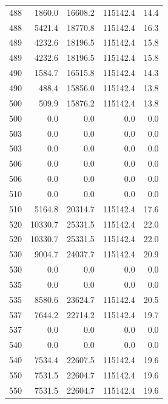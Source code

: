 \begin{longtable}{rrrrr}
    488 & \num{1860.0} & \num{16608.2} & \num{115142.4} & 14.4 \\
    488 & \num{5421.4} & \num{18770.8} & \num{115142.4} & 16.3 \\
    489 & \num{4232.6} & \num{18196.5} & \num{115142.4} & 15.8 \\
    489 & \num{4232.6} & \num{18196.5} & \num{115142.4} & 15.8 \\
    490 & \num{1584.7} & \num{16515.8} & \num{115142.4} & 14.3 \\
    490 & \num{488.4} & \num{15856.0} & \num{115142.4} & 13.8 \\
    500 & \num{509.9} & \num{15876.2} & \num{115142.4} & 13.8 \\
    500 & \num{0.0} & \num{0.0} & \num{0.0} & 0.0 \\
    503 & \num{0.0} & \num{0.0} & \num{0.0} & 0.0 \\
    503 & \num{0.0} & \num{0.0} & \num{0.0} & 0.0 \\
    506 & \num{0.0} & \num{0.0} & \num{0.0} & 0.0 \\
    506 & \num{0.0} & \num{0.0} & \num{0.0} & 0.0 \\
    510 & \num{0.0} & \num{0.0} & \num{0.0} & 0.0 \\
    510 & \num{5164.8} & \num{20314.7} & \num{115142.4} & 17.6 \\
    520 & \num{10330.7} & \num{25331.5} & \num{115142.4} & 22.0 \\
    520 & \num{10330.7} & \num{25331.5} & \num{115142.4} & 22.0 \\
    530 & \num{9004.7} & \num{24037.7} & \num{115142.4} & 20.9 \\
    530 & \num{0.0} & \num{0.0} & \num{0.0} & 0.0 \\
    535 & \num{0.0} & \num{0.0} & \num{0.0} & 0.0 \\
    535 & \num{8580.6} & \num{23624.7} & \num{115142.4} & 20.5 \\
    537 & \num{7644.2} & \num{22714.2} & \num{115142.4} & 19.7 \\
    537 & \num{0.0} & \num{0.0} & \num{0.0} & 0.0 \\
    540 & \num{0.0} & \num{0.0} & \num{0.0} & 0.0 \\
    540 & \num{7534.4} & \num{22607.5} & \num{115142.4} & 19.6 \\
    550 & \num{7531.5} & \num{22604.7} & \num{115142.4} & 19.6 \\
    550 & \num{7531.5} & \num{22604.7} & \num{115142.4} & 19.6 \\

\end{longtable}
